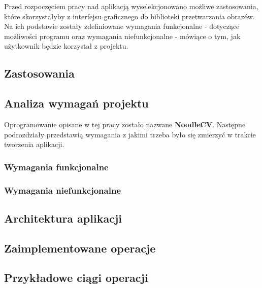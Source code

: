 
Przed rozpoczęciem pracy nad aplikacją wyselekcjonowano możliwe zastosowania, które skorzystałyby z interfejsu graficznego do biblioteki przetwarzania obrazów.
Na ich podstawie zostały zdefiniowane wymagania funkcjonalne - dotyczące możliwości programu oraz wymagania niefunkcjonalne - mówiące o tym, jak użytkownik będzie korzystał z projektu.

\subsection{Zastosowania}



\subsection{Analiza wymagań projektu}
Oprogramowanie opisane w tej pracy zostało nazwane \textbf{NoodleCV}. 
Następne podrozdziały przedstawią wymagania z jakimi trzeba było się zmierzyć w trakcie tworzenia aplikacji.

\subsubsection{Wymagania funkcjonalne}


\subsubsection{Wymagania niefunkcjonalne}


\subsection{Architektura aplikacji}


\subsection{Zaimplementowane operacje}


\subsection{Przykładowe ciągi operacji}
